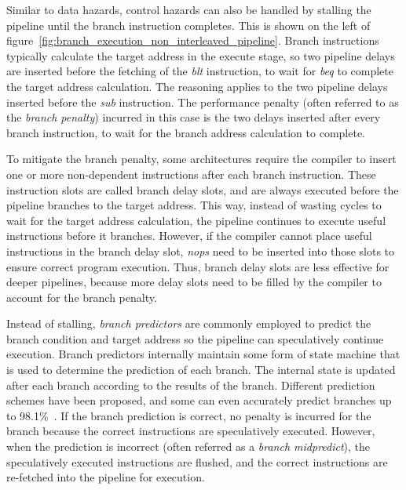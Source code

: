 Similar to data hazards, control hazards can also be handled by stalling the pipeline until the branch instruction completes. 
This is shown on the left of figure~\ref{fig:branch_execution_non_interleaved_pipeline}. 
Branch instructions typically calculate the target address in the execute stage, so two pipeline delays are inserted before the fetching of the \emph{blt} instruction, to wait for \emph{beq} to complete the target address calculation. 
The reasoning applies to the two pipeline delays inserted before the \emph{sub} instruction. 
The performance penalty (often referred to as the \emph{branch penalty}) incurred in this case is the two delays inserted after every branch instruction, to wait for the branch address calculation to complete.

To mitigate the branch penalty, some architectures require the compiler to insert one or more non-dependent instructions after each branch instruction.
These instruction slots are called branch delay slots, and are always executed before the pipeline branches to the target address. 
This way, instead of wasting cycles to wait for the target address calculation, the pipeline continues to execute useful instructions before it branches.
However, if the compiler cannot place useful instructions in the branch delay slot, \emph{nops} need to be inserted into those slots to ensure correct program execution.
Thus, branch delay slots are less effective for deeper pipelines, because more delay slots need to be filled by the compiler to account for the branch penalty.
  
Instead of stalling, \emph{branch predictors} are commonly employed to predict the branch condition and target address so the pipeline can speculatively continue execution. 
Branch predictors internally maintain some form of state machine that is used to determine the prediction of each branch.  
The internal state is updated after each branch according to the results of the branch. 
Different prediction schemes have been proposed, and some can even accurately predict branches up to 98.1\%~\cite{Mcfarling_Branch_predict}.  
If the branch prediction is correct, no penalty is incurred for the branch because the correct instructions are speculatively executed.  
However, when the prediction is incorrect (often referred as a \emph{branch midpredict}), the speculatively executed instructions are flushed, and the correct instructions are re-fetched into the pipeline for execution.

